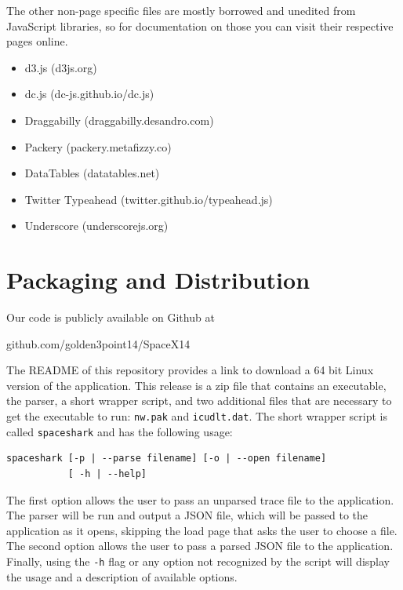 \documentclass{hmcclinic}
\begin{document}
  The other non-page specific files are mostly borrowed and unedited from
  JavaScript libraries, so for documentation on those you can visit their
  respective pages online.
\begin{itemize}
\item d3.js (d3js.org)
\item dc.js (dc-js.github.io/dc.js)
\item Draggabilly (draggabilly.desandro.com)
\item Packery (packery.metafizzy.co)
\item DataTables (datatables.net)
\item Twitter Typeahead (twitter.github.io/typeahead.js)
\item Underscore (underscorejs.org)
\end{itemize}

\section{Packaging and Distribution}
  Our code is publicly available on Github at
\begin{center}
  github.com/golden3point14/SpaceX14
\end{center}
The README of this repository provides a link to download a
  64 bit Linux version of the application. This release is a zip file that
  contains an executable, the parser, a short wrapper script, and two additional
  files that are necessary to get the executable to run: \texttt{nw.pak} and
  \texttt{icudlt.dat}.
  The short wrapper script is called \texttt{spaceshark} and has the following usage:

\begin{verbatim}spaceshark [-p | --parse filename] [-o | --open filename] 
           [ -h | --help]\end{verbatim}

  The first option allows the user to pass an unparsed trace file to the
  application. The parser will be run and output a JSON file, which will be
  passed to the application as it opens, skipping the load page that asks the
  user to choose a file. The second option allows the user to pass a parsed
  JSON file to the application. Finally, using the \texttt{-h} flag or any option
  not recognized by the script will display the usage and a description of
  available options.
\end{document}
